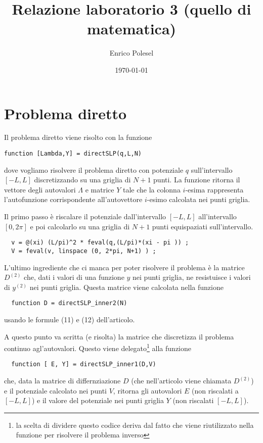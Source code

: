 \documentclass[a4paper,10pt]{article}
\title{Relazione laboratorio 3 (quello di matematica)}
\author{Enrico Polesel}
\date{\today}
\theoremstyle{plain}
\theoremstyle{definition}
\theoremstyle{remark}
\begin{document}
\maketitle

\lstset{language=Matlab,frame=single}

\section{Problema diretto}

Il problema diretto viene risolto con la funzione
\begin{lstlisting}
function [Lambda,Y] = directSLP(q,L,N)
\end{lstlisting}
dove vogliamo risolvere il problema diretto con potenziale $q$
sull'intervallo $[-L,L]$ discretizzando su una griglia di $N+1$
punti. La funzione ritorna il vettore degli autovalori $\Lambda$ e
matrice $Y$ tale che la colonna $i$-esima rappresenta l'autofunzione
corrispondente all'autovettore $i$-esimo calcolata nei punti griglia. 

Il primo passo è riscalare il potenziale dall'intervallo $[-L,L]$
all'intervallo $[0,2\pi ]$ e poi calcolarlo su una griglia di $N+1$
punti equispaziati sull'intervallo.
\begin{lstlisting}
  v = @(xi) (L/pi)^2 * feval(q,(L/pi)*(xi - pi )) ;
  V = feval(v, linspace (0, 2*pi, N+1) ) ;
\end{lstlisting}

L'ultimo ingrediente che ci manca per poter risolvere il problema è la
matrice $D^{(2)}$ che, dati i valori di una funzione $y$ nei punti
griglia, ne resistuisce i valori di $y^{(2)}$ nei punti
griglia. Questa matrice viene calcolata nella funzione
\begin{lstlisting}
  function D = directSLP_inner2(N)
\end{lstlisting}
usando le formule (11) e (12) dell'articolo.

A questo punto va scritta (e risolta) la matrice che discretizza il
problema continuo agl'autovalori. Questo viene delegato\footnote{la
  scelta di dividere questo codice deriva dal fatto che viene
  riutilizzato nella funzione per risolvere il problema inverso} alla
funzione
\begin{lstlisting}
  function [ E, Y] = directSLP_inner1(D,V)
\end{lstlisting}
che, data la matrice di differnziazione $D$ (che nell'articolo viene
chiamata $D^{(2)}$) e il potenziale calcolato nei punti $V$, ritorna
gli autovalori $E$ (non riscalati a $[-L,L]$) e il valore del potenziale nei
punti griglia $Y$ (non riscalati $[-L,L]$).
\end{document}
